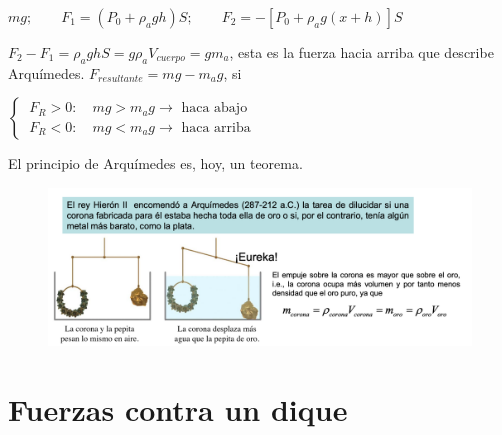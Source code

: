 $mg;\qquad F_1=(P_0+\rho_a g h)S; \qquad F_2=-[P_0+\rho_ag(x+h)]S$

$F_2-F_1=\rho_a g h S=g \rho_a V_{cuerpo}=g m_a$, esta es la fuerza hacia arriba que describe Arquímedes.
$F_{resultante}=mg-m_ag$, si 

$\begin{cases}\ F_R>0:\quad mg>m_ag \to \text{ haca abajo} \\ \ F_R<0:\quad mg<m_ag \to \text{ haca arriba} \end{cases}$


El principio de Arquímedes es, hoy, un teorema.


\begin{figure}[H]
	\centering
	\includegraphics[width=1\textwidth]{imagenes/imagenes07/T07IM12.png}
\end{figure}

\newpage %
\section{Fuerzas contra un dique}

